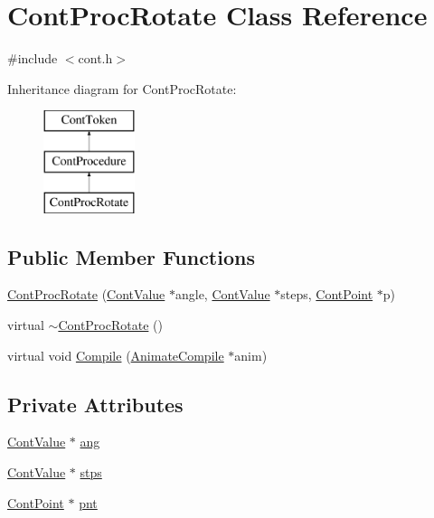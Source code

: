 \hypertarget{a00081}{\section{Cont\-Proc\-Rotate Class Reference}
\label{a00081}
}


{\ttfamily \#include $<$cont.\-h$>$}

Inheritance diagram for Cont\-Proc\-Rotate\-:\begin{figure}[H]
\begin{center}
\leavevmode
\includegraphics[height=3.000000cm]{a00081}
\end{center}
\end{figure}
\subsection*{Public Member Functions}
\begin{DoxyCompactItemize}
\item 
\hyperlink{a00081_a4672d5611c72f3d856ec53c79414b0fb}{Cont\-Proc\-Rotate} (\hyperlink{a00086}{Cont\-Value} $\ast$angle, \hyperlink{a00086}{Cont\-Value} $\ast$steps, \hyperlink{a00062}{Cont\-Point} $\ast$p)
\item 
virtual \hyperlink{a00081_aef921cf81bb1d5f814e3d1a59fe1d988}{$\sim$\-Cont\-Proc\-Rotate} ()
\item 
virtual void \hyperlink{a00081_a43308004b90299c4f06d4f7df29472ae}{Compile} (\hyperlink{a00007}{Animate\-Compile} $\ast$anim)
\end{DoxyCompactItemize}
\subsection*{Private Attributes}
\begin{DoxyCompactItemize}
\item 
\hyperlink{a00086}{Cont\-Value} $\ast$ \hyperlink{a00081_af8b0975b0e13c22fbbe83ac5ea88428d}{ang}
\item 
\hyperlink{a00086}{Cont\-Value} $\ast$ \hyperlink{a00081_a5e6ce0fd72cfd4220a4a501774a8226d}{stps}
\item 
\hyperlink{a00062}{Cont\-Point} $\ast$ \hyperlink{a00081_a8765065ec0653f1b66bcec6ee9e116fe}{pnt}
\end{DoxyCompactItemize}
